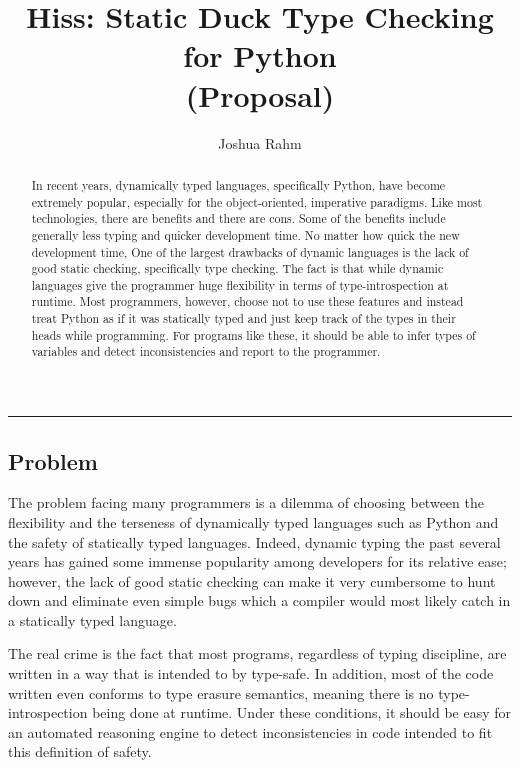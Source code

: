 \documentclass{article}
\title{Hiss: Static Duck Type Checking for Python\\ (Proposal)}
\author{Joshua Rahm}
\begin{document}
\nocite{*}
\maketitle
\hrule

\begin{multicols}{2}

\begin{abstract}

    In recent years, dynamically typed languages, specifically Python, have
    become extremely popular, especially for the object-oriented, imperative
    paradigms. Like most technologies, there are benefits and there are cons.
    Some of the benefits include generally less typing and quicker development
    time. No matter how quick the new development time, One of the largest
    drawbacks of dynamic languages is the lack of good static checking,
    specifically type checking. The fact is that while dynamic languages give
    the programmer huge flexibility in terms of type-introspection at runtime.
    Most programmers, however, choose not to use these features and instead
    treat Python as if it was statically typed and just keep track of the types
    in their heads while programming. For programs like these, it should be
    able to infer types of variables and detect inconsistencies and report to
    the programmer.

\end{abstract}

\section*{Problem}

The problem facing many programmers is a dilemma of choosing between the
flexibility and the terseness of dynamically typed languages such as Python and
the safety of statically typed languages. Indeed, dynamic typing the past
several years has gained some immense popularity among developers for its
relative ease; however, the lack of good static checking can make it very
cumbersome to hunt down and eliminate even simple bugs which a compiler
would most likely catch in a statically typed language.

The real crime is the fact that most programs, regardless of typing discipline,
are written in a way that is intended to by type-safe.  In addition, most of
the code written even conforms to type erasure semantics, meaning there is no
type-introspection being done at runtime. Under these conditions, it should be
easy for an automated reasoning engine to detect inconsistencies in code intended
to fit this definition of safety.


\end{multicols}
\end{document}
